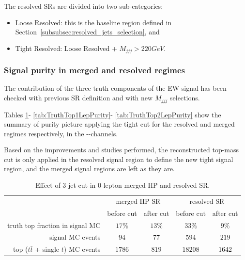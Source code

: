 The resolved SRs are divided into two sub-categories:
\begin{itemize}
  \item Loose Resolved: this is the baseline region defined in Section~\ref{subsubsec:resolved_jets_selection}, and
  \item Tight Resolved: Loose Resolved + $M_{jjj} > 220 GeV$.
\end{itemize}

\subsubsection{Signal purity in merged and resolved regimes}
\label{subsec:SignalPurity}

The contribution of the three truth components of the EW signal has been checked with previous SR definition and with new $M_{jjj}$ selections. 

Tables
\ref{tab:0leptopMassTable}-
\ref{tab:TruthTop1LepPurity}-
\ref{tab:TruthTop2LepPurity}
show the summary of purity picture applying the tight cut for the resolved and merged regimes 
respectively, in the \zlep-\olep-\tlep channels.

Based on the improvements and studies performed, the reconstructed top-mass cut is only applied in the resolved signal region to define the new tight signal region, and the merged signal regions are left as they are.

\begin{table}[ht]
    \centering
    \begin{tabular}{r|c|c|c|c}
         & \multicolumn{2}{c|}{merged HP SR} & \multicolumn{2}{c}{resolved SR}\\
         & before cut & after cut & before cut & after cut\\
         \hline
         truth top fraction in signal MC & $17\%$ & $13\%$ &$33\%$ & $9\%$ \\
         signal MC events & $94$ & $77$ & $594$ & $219$ \\
         top ($t\bar t$ + single $t$) MC events & $1786$ & $819$ & $18208$ & $1642$ \\
        \end{tabular}
        \caption{Effect of 3 jet cut in 0-lepton merged HP and resolved SR.} 
        \label{tab:0leptopMassTable}
\end{table}

